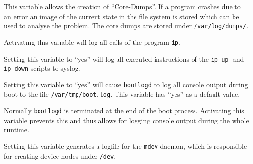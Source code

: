 \begin{description}


  This variable allows the creation of ``Core-Dumps''. If a program crashes
  due to an error an image of the current state in the file system is stored
  which can be used to analyse the problem. The core dumps are stored under
  \texttt{/var/log/dumps/}.


  Activating this variable will log all calls of the program \texttt{ip}.


  Setting this variable to ``yes'' will log all executed instructions of the
  \texttt{ip-up}- and \texttt{ip-down}-scripts to syslog.


  Setting this variable to ``yes'' will cause \texttt{bootlogd} to log all console
  output during boot to the file \texttt{/var/tmp/boot.log}. This variable has
  ``yes'' as a default value.


  Normally \texttt{bootlogd} is terminated at the end of the boot process.
  Activating this variable prevents this and thus allows for logging console
  output during the whole runtime.


  Setting this variable generates a logfile for the \texttt{mdev}-daemon,
  which is responsible for creating device nodes under \texttt{/dev}.

\end{description}
